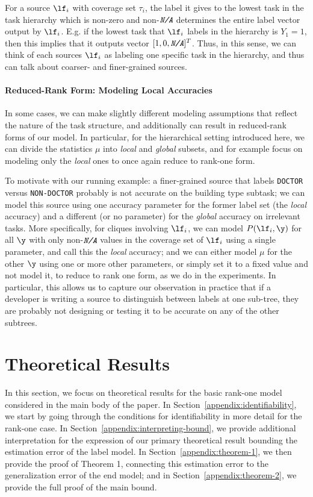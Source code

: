 \documentclass[letterpaper]{article}
\begin{document}
\begin{appendix}
For a source $\lf_i$ with coverage set $\tau_i$, the label it gives to the lowest task in the task hierarchy which is non-zero and non-$\textit{\texttt{N/A}}$ determines the entire label vector output by $\lf_i$.
E.g. if the lowest task that $\lf_i$ labels in the hierarchy is $Y_1=1$, then this implies that it outputs vector $[1, 0, \textit{\texttt{N/A}}]^T$.
Thus, in this sense, we can think of each sources $\lf_i$ as labeling one specific task in the hierarchy, and thus can talk about coarser- and finer-grained sources.
\paragraph*{Reduced-Rank Form: Modeling Local Accuracies}
In some cases, we can make slightly different modeling assumptions that reflect the nature of the task structure, and additionally can result in reduced-rank forms of our model.
In particular, for the hierarchical setting introduced here, we can divide the statistics $\mu$ into \textit{local} and \textit{global} subsets, and for example focus on modeling only the \textit{local} ones to once again reduce to rank-one form.

To motivate with our running example: a finer-grained source that labels \texttt{DOCTOR} versus \texttt{NON-DOCTOR} probably is not accurate on the building type subtask; we can model this source using one accuracy parameter for the former label set (the \textit{local} accuracy) and a different (or no parameter) for the \textit{global} accuracy on irrelevant tasks.
More specifically, for cliques involving $\lf_i$, we can model $P(\lf_i, \y)$ for all $\y$ with only non-$\textit{\texttt{N/A}}$ values in the coverage set of $\lf_i$ using a single parameter, and call this the \textit{local} accuracy; and we can either model $\mu$ for the other $\y$ using one or more other parameters, or simply set it to a fixed value and not model it, to reduce to rank one form, as we do in the experiments.
In particular, this allows us to capture our observation in practice that if a developer is writing a source to distinguish between labels at one sub-tree, they are probably not designing or testing it to be accurate on any of the other subtrees. 
\section{Theoretical Results}
  \label{appendix:theoretical}
  \allowdisplaybreaks

In this section, we focus on theoretical results for the basic rank-one model considered in the main body of the paper.
In Section~\ref{appendix:identifiability}, we start by going through the conditions for identifiability in more detail for the rank-one case.
In Section~\ref{appendix:interpreting-bound}, we provide additional interpretation for the expression of our primary theoretical result bounding the estimation error of the label model.
In Section~\ref{appendix:theorem-1}, we then provide the proof of Theorem 1, connecting this estimation error to the generalization error of the end model; and in Section~\ref{appendix:theorem-2}, we provide the full proof of the main bound.



\end{appendix}
\end{document}
